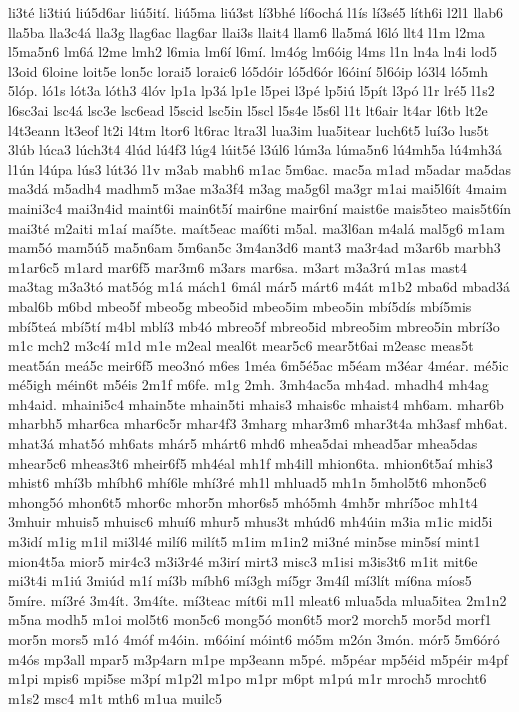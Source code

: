 {li3té
li3tiú
liú5d6ar
liú5ití.
liú5ma
liú3st
lí3bhé
lí6ochá
l1ís
lí3sé5
líth6i
l2l1
llab6
lla5ba
lla3c4á
lla3g
llag6ac
llag6ar
llai3s
llait4
llam6
lla5má
l6ló
llt4
l1m
l2ma
l5ma5n6
lm6á
l2me
lmh2
l6mia
lm6í
l6mí.
lm4óg
lm6óig
l4ms
l1n
ln4a
ln4i
lod5
l3oid
6loine
loit5e
lon5c
lorai5
loraic6
ló5dóir
ló5d6ór
l6óiní
5l6óip
ló3l4
ló5mh
5lóp.
ló1s
lót3a
lóth3
4lóv
lp1a
lp3á
lp1e
l5pei
l3pé
lp5iú
l5pít
l3pó
l1r
lré5
l1s2
l6sc3ai
lsc4á
lsc3e
lsc6ead
l5scid
lsc5in
l5scl
l5s4e
l5s6l
l1t
lt6air
lt4ar
l6tb
lt2e
l4t3eann
lt3eof
lt2i
l4tm
ltor6
lt6rac
ltra3l
lua3im
lua5itear
luch6t5
luí3o
lus5t
3lúb
lúca3
lúch3t4
4lúd
lú4f3
lúg4
lúit5é
l3úl6
lúm3a
lúma5n6
lú4mh5a
lú4mh3á
l1ún
l4úpa
lús3
lút3ó
l1v
m3ab
mabh6
m1ac
5m6ac.
mac5a
m1ad
m5adar
ma5das
ma3dá
m5adh4
madhm5
m3ae
m3a3f4
m3ag
ma5g6l
ma3gr
m1ai
mai5l6ít
4maim
maini3c4
mai3n4id
maint6i
main6t5í
mair6ne
mair6ní
maist6e
mais5teo
mais5t6ín
mai3té
m2aiti
m1aí
maí5te.
maít5eac
maí6ti
m5al.
ma3l6an
m4alá
mal5g6
m1am
mam5ó
mam5ú5
ma5n6am
5m6an5c
3m4an3d6
mant3
ma3r4ad
m3ar6b
marbh3
m1ar6c5
m1ard
mar6f5
mar3m6
m3ars
mar6sa.
m3art
m3a3rú
m1as
mast4
ma3tag
m3a3tó
mat5óg
m1á
mách1
6mál
már5
márt6
m4át
m1b2
mba6d
mbad3á
mbal6b
m6bd
mbeo5f
mbeo5g
mbeo5id
mbeo5im
mbeo5in
mbí5dís
mbí5mis
mbí5teá
mbí5tí
m4bl
mblí3
mb4ó
mbreo5f
mbreo5id
mbreo5im
mbreo5in
mbrí3o
m1c
mch2
m3c4í
m1d
m1e
m2eal
meal6t
mear5c6
mear5t6ai
m2easc
meas5t
meat5án
meá5c
meir6f5
meo3nó
m6es
1méa
6m5é5ac
m5éam
m3éar
4méar.
mé5ic
mé5igh
méin6t
m5éis
2m1f
m6fe.
m1g
2mh.
3mh4ac5a
mh4ad.
mhadh4
mh4ag
mh4aid.
mhaini5c4
mhain5te
mhain5ti
mhais3
mhais6c
mhaist4
mh6am.
mhar6b
mharbh5
mhar6ca
mhar6c5r
mhar4f3
3mharg
mhar3m6
mhar3t4a
mh3asf
mh6at.
mhat3á
mhat5ó
mh6ats
mhár5
mhárt6
mhd6
mhea5dai
mhead5ar
mhea5das
mhear5c6
mheas3t6
mheir6f5
mh4éal
mh1f
mh4ill
mhion6ta.
mhion6t5aí
mhis3
mhist6
mhí3b
mhíbh6
mhí6le
mhí3ré
mh1l
mhluad5
mh1n
5mhol5t6
mhon5c6
mhong5ó
mhon6t5
mhor6c
mhor5n
mhor6s5
mhó5mh
4mh5r
mhrí5oc
mh1t4
3mhuir
mhuis5
mhuisc6
mhuí6
mhur5
mhus3t
mhúd6
mh4úin
m3ia
m1ic
mid5i
m3idí
m1ig
m1il
mi3l4é
milí6
milít5
m1im
m1in2
mi3né
min5se
min5sí
mint1
mion4t5a
mior5
mir4c3
m3i3r4é
m3irí
mirt3
misc3
m1isi
m3is3t6
m1it
mit6e
mi3t4i
m1iú
3miúd
m1í
mí3b
míbh6
mí3gh
mí5gr
3m4íl
mí3lít
mí6na
míos5
5míre.
mí3ré
3m4ít.
3m4íte.
mí3teac
mít6i
m1l
mleat6
mlua5da
mlua5itea
2m1n2
m5na
modh5
m1oi
mol5t6
mon5c6
mong5ó
mon6t5
mor2
morch5
mor5d
morf1
mor5n
mors5
m1ó
4móf
m4óin.
m6óiní
móint6
mó5m
m2ón
3món.
mór5
5m6óró
m4ós
mp3all
mpar5
m3p4arn
m1pe
mp3eann
m5pé.
m5péar
mp5éid
m5péir
m4pf
m1pi
mpis6
mpi5se
m3pí
m1p2l
m1po
m1pr
m6pt
m1pú
m1r
mroch5
mrocht6
m1s2
msc4
m1t
mth6
m1ua
muilc5
}
